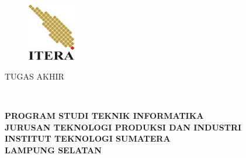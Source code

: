 \clearpage
\pagestyle{empty}

\begin{center}
\smallskip

    \begin{figure}[h]
    	\centering
    	\includegraphics[width=2.1cm, height=2.5cm, keepaspectratio]{figures/itera-logo}
    \end{figure}

	\large \bfseries \MakeUppercase{\thetitle}
	\vfill

    \large \uppercase{Tugas Akhir}
    \vfill

    \normalsize \normalfont \theauthor\\
    \printnim
    \vfill

    \normalsize \bfseries
    \uppercase{
        Program Studi Teknik Informatika \\
        Jurusan Teknologi Produksi dan Industri\\
        Institut Teknologi Sumatera\\
        Lampung Selatan
    }\medskip

    \the\year{}

\end{center}

\clearpage
